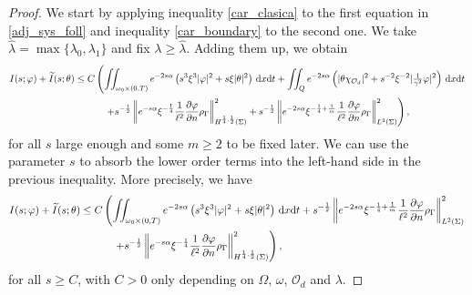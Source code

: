 \documentclass{aims}
\theoremstyle{definition}
\def\csbd{\rho_{\Gamma}}
\def\dx{\,\textnormal{d}x}
\def\dt{\textnormal{d}t}
\begin{document}
\begin{proof}
We start by applying inequality \eqref{car_clasica} to the first equation in \eqref{adj_sys_foll} and inequality \eqref{car_boundary} to the second one. We take $\hat \lambda=\max\{\lambda_0,\lambda_1\}$ and fix $\lambda\geq \hat \lambda$. Adding them up, we obtain
%
\begin{equation*}
\begin{split}
I(s;\varphi)+\widetilde{I}(s;\theta)\leq C&\left(\iint_{\omega_0\times(0,T)}e^{-2s\alpha}\left(s^3\xi^3|\varphi|^2+s\xi|\theta|^2\right)\dx\dt +\iint_Q e^{-2s\alpha}\left(|\theta\chi_{\mathcal O_d}|^2+s^{-2}\xi^{-2}|\tfrac{1}{\gamma^2}\varphi|^2\right)\dx\dt\right. \\
&\quad\left. +s^{-\frac{1}{2}}\left\|e^{-s\alpha}\xi^{-\frac{1}{4}}\frac{1}{\ell^2}\frac{\partial \varphi}{\partial n}\csbd \right\|^2_{H^{\frac{1}{4},\frac{1}{2}}(\Sigma)}+s^{-\frac{1}{2}}\left\| e^{-2s\alpha}\xi^{-\frac{1}{4}+\frac{1}{m}} \frac{1}{\ell^2}\frac{\partial \varphi}{\partial n} \csbd \right\|^{2}_{L^2(\Sigma)}  \right),
\end{split}
\end{equation*}
%
for all $s$ large enough and some $m\geq 2$ to be fixed later. We can use the parameter $s$ to absorb the lower order terms into the left-hand side in the previous inequality. More precisely, we have 
%
\begin{equation}\label{car_con_bound}
\begin{split}
I(s;\varphi)+\widetilde{I}(s;\theta)\leq C&\left(\iint_{\omega_0\times(0,T)}e^{-2s\alpha}\left(s^3\xi^3|\varphi|^2+s\xi|\theta|^2\right)\dx\dt + s^{-\frac{1}{2}}\left\| e^{-2s\alpha}\xi^{-\frac{1}{4}+\frac{1}{m}} \frac{1}{\ell^2}\frac{\partial \varphi}{\partial n} \csbd \right\|^{2}_{L^2(\Sigma)} \right. \\
&\quad\left. +s^{-\frac{1}{2}}\left\|e^{-s\alpha}\xi^{-\frac{1}{4}}\frac{1}{\ell^2}\frac{\partial \varphi}{\partial n}\csbd \right\|^2_{H^{\frac{1}{4},\frac{1}{2}}(\Sigma)}  \right),
\end{split}
\end{equation}
%
for all $s\geq C$, with $C>0$ only depending on $\Omega$, $\omega$, $\mathcal O_d$ and $\lambda$. 


\end{proof}
\end{document}
